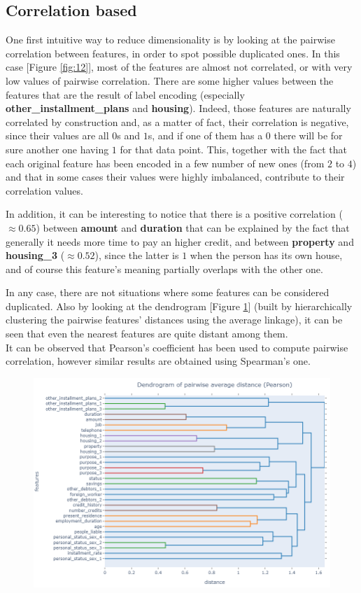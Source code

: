 \documentclass[letterpaper]{article}
\begin{document}
	\subsection{Correlation based}
	One first intuitive way to reduce dimensionality is by looking at the pairwise correlation between features, in order to spot possible duplicated ones. In this case [Figure \ref{fig:12}], most of the features are almost not correlated, or with very low values of pairwise correlation. There are some higher values between the features that are the result of label encoding (especially \textbf{other\_installment\_plans} and \textbf{housing}). Indeed, those features are naturally correlated by construction and, as a matter of fact, their correlation is negative, since their values are all $0$s and $1$s, and if one of them has a $0$ there will be for sure another one having $1$ for that data point. This, together with the fact that each original feature has been encoded in a few number of new ones (from $2$ to $4$) and that in some cases their values were highly imbalanced, contribute to their correlation values. 
	\par In addition, it can be interesting to notice that there is a positive correlation ($\approx 0.65$) between \textbf{amount} and \textbf{duration} that can be explained by the fact that generally it needs more time to pay an higher credit, and between \textbf{property} and \textbf{housing\_3} ($\approx 0.52$), since the latter is $1$ when the person has its own house, and of course this feature's meaning partially overlaps with the other one.
	\par In any case, there are not situations where some features can be considered duplicated. Also by looking at the dendrogram [Figure \ref{fig:13}] (built by hierarchically clustering the pairwise features' distances using the average linkage), it can be seen that even the nearest features are quite distant among them.  \\
	It can be observed that Pearson's coefficient has been used to compute pairwise correlation, however similar results are obtained using Spearman's one.
	\begin{figure}[h]
		\centering
		\includegraphics[width=.8\textwidth]{images/dendrogram_pearson.png}
		\label{fig:13}
	\end{figure}
	
\end{document}
